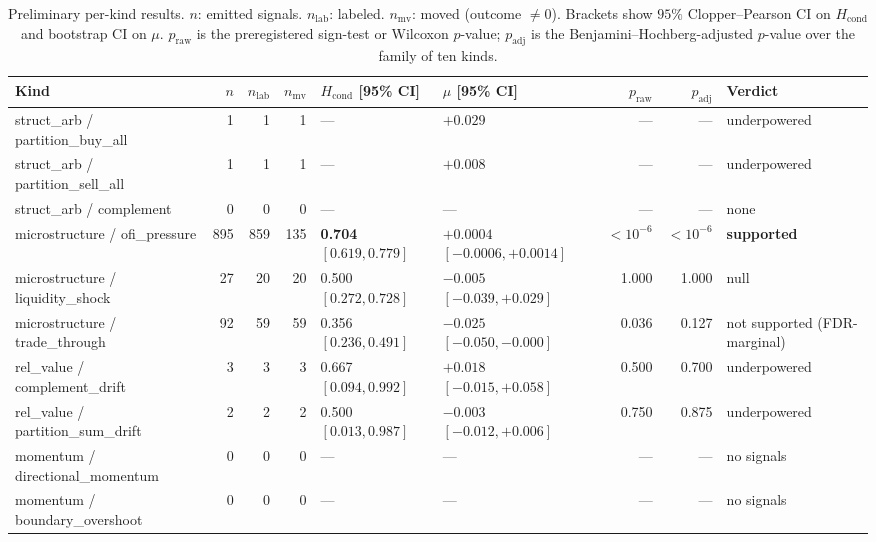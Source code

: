 \documentclass[review,12pt,authoryear]{elsarticle}
\begin{document}
\begin{table}[t]
\centering
\caption{Preliminary per-kind results. \(n\): emitted signals.
\(n_\text{lab}\): labeled. \(n_\text{mv}\): moved (outcome \(\neq 0\)).
Brackets show \(95\%\) Clopper--Pearson CI on \(H_\text{cond}\) and bootstrap
CI on \(\mu\). \(p_\text{raw}\) is the preregistered sign-test or Wilcoxon
\(p\)-value; \(p_\text{adj}\) is the Benjamini--Hochberg-adjusted \(p\)-value
over the family of ten kinds.}
\label{tab:results}
\footnotesize
\begin{tabularx}{\linewidth}{l r r r l l r r l}
\toprule
Kind & \(n\) & \(n_\text{lab}\) & \(n_\text{mv}\) & \(H_\text{cond}\) [95\% CI] & \(\mu\) [95\% CI] & \(p_\text{raw}\) & \(p_\text{adj}\) & Verdict \\
\midrule
struct\_arb / partition\_buy\_all   &   1 &   1 &   1 & --- & \(+0.029\) & --- & --- & underpowered \\
struct\_arb / partition\_sell\_all  &   1 &   1 &   1 & --- & \(+0.008\) & --- & --- & underpowered \\
struct\_arb / complement            &   0 &   0 &   0 & --- & --- & --- & --- & none \\
microstructure / ofi\_pressure       & 895 & 859 & 135 & \textbf{0.704} \([0.619, 0.779]\) & \(+0.0004\) \([-0.0006, +0.0014]\) & \(<10^{-6}\) & \(<10^{-6}\) & \textbf{supported} \\
microstructure / liquidity\_shock    &  27 &  20 &  20 & 0.500 \([0.272, 0.728]\) & \(-0.005\) \([-0.039, +0.029]\) & 1.000 & 1.000 & null \\
microstructure / trade\_through      &  92 &  59 &  59 & 0.356 \([0.236, 0.491]\) & \(-0.025\) \([-0.050, -0.000]\) & 0.036 & 0.127 & not supported (FDR-marginal) \\
rel\_value / complement\_drift       &   3 &   3 &   3 & 0.667 \([0.094, 0.992]\) & \(+0.018\) \([-0.015, +0.058]\) & 0.500 & 0.700 & underpowered \\
rel\_value / partition\_sum\_drift   &   2 &   2 &   2 & 0.500 \([0.013, 0.987]\) & \(-0.003\) \([-0.012, +0.006]\) & 0.750 & 0.875 & underpowered \\
momentum / directional\_momentum     &   0 &   0 &   0 & --- & --- & --- & --- & no signals \\
momentum / boundary\_overshoot       &   0 &   0 &   0 & --- & --- & --- & --- & no signals \\
\bottomrule
\end{tabularx}
\end{table}
\end{document}
